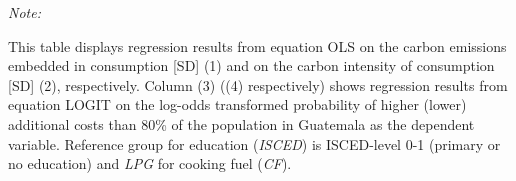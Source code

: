 \begin{table}[htbp!]
\begin{adjustbox}{width = 1\textwidth, max height = 0.95\textheight, center}
\begin{threeparttable}[b]
         \begin{tablenotes}\item \medskip \textit{Note:}
            \item This table displays regression results from equation OLS on the carbon emissions embedded in consumption [SD] (1) and on the carbon intensity of consumption [SD] (2), respectively. 
                                      Column (3) ((4) respectively) shows regression results from equation LOGIT on the log-odds transformed probability of higher (lower) additional costs than 80\% of the population in Guatemala as the dependent variable. Reference group for education (\textit{ISCED}) is ISCED-level 0-1 (primary or no education) and \textit{LPG} for cooking fuel (\textit{CF}).
         \end{tablenotes}
      \end{threeparttable}
   \end{adjustbox}
\end{table}


